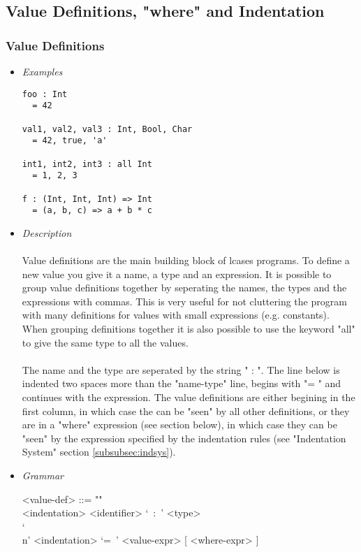\documentclass{article}
\begin{document}
\subsection{Value Definitions, "where" and Indentation}
\label{subsec:valdefs}

\subsubsection{Value Definitions}

\begin{itemize}

\item \textit{Examples}

\begin{verbatim}
foo : Int
  = 42

val1, val2, val3 : Int, Bool, Char
  = 42, true, 'a'

int1, int2, int3 : all Int
  = 1, 2, 3

f : (Int, Int, Int) => Int
  = (a, b, c) => a + b * c
\end{verbatim}

\item \textit{Description}\\\\
Value definitions are the main building block of lcases programs. To define a
new value you give it a name, a type and an expression. It is possible to group
value definitions together by seperating the names, the types and the
expressions with commas. This is very useful for not cluttering the program
with many definitions for values with small expressions (e.g. constants).  When
grouping definitions together it is also possible to use the keyword "all" to
give the same type to all the values.
\\\\
The name and the type are seperated by the string " : ". The line below is
indented two spaces more than the "name-type" line, begins with "= " and
continues with the expression.  The value definitions are either begining in
the first column, in which case the can be "seen" by all other definitions, or
they are in a "where" expression (see section below), in which case they can be
"seen" by the expression specified by the indentation rules (see "Indentation
System" section \ref{subsubsec:indsys}).

\item \textit{Grammar}
\begin{grammar}
<value-def> ::= ""\\
<indentation> <identifier> `\ :\ ' <type> \\
`\\n' <indentation> `=\ ' <value-expr> [ <where-expr> ]


\end{grammar}
\end{itemize}
\end{document}

